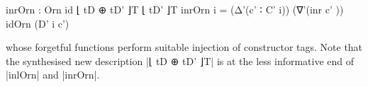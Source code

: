 {\begin{code}
inrOrn  : Orn id ⌊ tD ⊕ tD' ⌋T ⌊ tD' ⌋T
inrOrn  i  =  (Δ'(c'  ∶ C' i))  (∇'(inr  c'  ))  idOrn (D' i c')
\end{code}
whose forgetful functions perform suitable injection of constructor tags.
Note that the synthesised new description |⌊ tD ⊕ tD' ⌋T| is at the less informative end of |inlOrn| and |inrOrn|.}



































